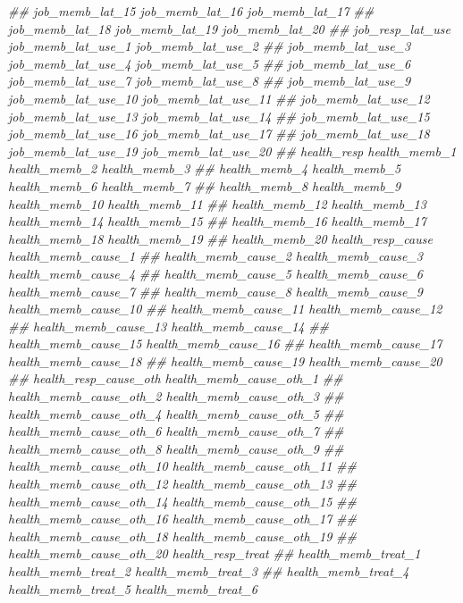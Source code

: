 \documentclass[
]{article}
\newenvironment{Shaded}{\begin{snugshade}}{\end{snugshade}}
\newcommand{\CommentTok}[1]{\textcolor[rgb]{0.56,0.35,0.01}{\textit{#1}}}
\begin{document}
\begin{Shaded}
\begin{Highlighting}[]
\CommentTok{##      job_memb_lat_15 job_memb_lat_16 job_memb_lat_17}
\CommentTok{##      job_memb_lat_18 job_memb_lat_19 job_memb_lat_20}
\CommentTok{##      job_resp_lat_use job_memb_lat_use_1 job_memb_lat_use_2}
\CommentTok{##      job_memb_lat_use_3 job_memb_lat_use_4 job_memb_lat_use_5}
\CommentTok{##      job_memb_lat_use_6 job_memb_lat_use_7 job_memb_lat_use_8}
\CommentTok{##      job_memb_lat_use_9 job_memb_lat_use_10 job_memb_lat_use_11}
\CommentTok{##      job_memb_lat_use_12 job_memb_lat_use_13 job_memb_lat_use_14}
\CommentTok{##      job_memb_lat_use_15 job_memb_lat_use_16 job_memb_lat_use_17}
\CommentTok{##      job_memb_lat_use_18 job_memb_lat_use_19 job_memb_lat_use_20}
\CommentTok{##      health_resp health_memb_1 health_memb_2 health_memb_3}
\CommentTok{##      health_memb_4 health_memb_5 health_memb_6 health_memb_7}
\CommentTok{##      health_memb_8 health_memb_9 health_memb_10 health_memb_11}
\CommentTok{##      health_memb_12 health_memb_13 health_memb_14 health_memb_15}
\CommentTok{##      health_memb_16 health_memb_17 health_memb_18 health_memb_19}
\CommentTok{##      health_memb_20 health_resp_cause health_memb_cause_1}
\CommentTok{##      health_memb_cause_2 health_memb_cause_3 health_memb_cause_4}
\CommentTok{##      health_memb_cause_5 health_memb_cause_6 health_memb_cause_7}
\CommentTok{##      health_memb_cause_8 health_memb_cause_9 health_memb_cause_10}
\CommentTok{##      health_memb_cause_11 health_memb_cause_12}
\CommentTok{##      health_memb_cause_13 health_memb_cause_14}
\CommentTok{##      health_memb_cause_15 health_memb_cause_16}
\CommentTok{##      health_memb_cause_17 health_memb_cause_18}
\CommentTok{##      health_memb_cause_19 health_memb_cause_20}
\CommentTok{##      health_resp_cause_oth health_memb_cause_oth_1}
\CommentTok{##      health_memb_cause_oth_2 health_memb_cause_oth_3}
\CommentTok{##      health_memb_cause_oth_4 health_memb_cause_oth_5}
\CommentTok{##      health_memb_cause_oth_6 health_memb_cause_oth_7}
\CommentTok{##      health_memb_cause_oth_8 health_memb_cause_oth_9}
\CommentTok{##      health_memb_cause_oth_10 health_memb_cause_oth_11}
\CommentTok{##      health_memb_cause_oth_12 health_memb_cause_oth_13}
\CommentTok{##      health_memb_cause_oth_14 health_memb_cause_oth_15}
\CommentTok{##      health_memb_cause_oth_16 health_memb_cause_oth_17}
\CommentTok{##      health_memb_cause_oth_18 health_memb_cause_oth_19}
\CommentTok{##      health_memb_cause_oth_20 health_resp_treat}
\CommentTok{##      health_memb_treat_1 health_memb_treat_2 health_memb_treat_3}
\CommentTok{##      health_memb_treat_4 health_memb_treat_5 health_memb_treat_6}

\end{Highlighting}
\end{Shaded}
\end{document}
